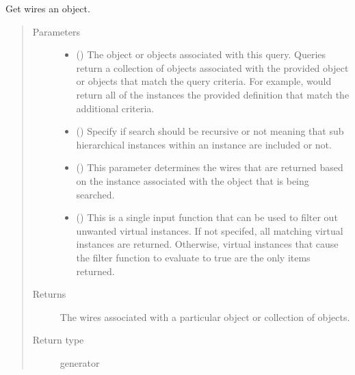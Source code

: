 \documentclass[letterpaper,10pt,english,openany,oneside]{sphinxmanual}
\begin{document}
\begin{fulllineitems}
\label{\detokenize{reference/classes/generated/spydrnet.get_wires:spydrnet.get_wires}}
Get wires  an object.
\begin{quote}\begin{description}
\item[{Parameters}] \leavevmode\begin{itemize}
\item {} 
 () \textendash{} The object or objects associated with this query. Queries return a collection of objects associated with the
provided object or objects that match the query criteria. For example,  would
return all of the instances  the provided definition that match the additional criteria.

\item {} 
 () \textendash{} Specify if search should be recursive or not meaning that sub hierarchical instances within an instance are
included or not.

\item {} 
 () \textendash{} This parameter determines the wires that are returned based on the instance associated with the object that is
being searched.

\item {} 
 () \textendash{} This is a single input function that can be used to filter out unwanted virtual instances. If not specifed, all
matching virtual instances are returned. Otherwise, virtual instances that cause the filter function to evaluate
to true are the only items returned.

\end{itemize}

\item[{Returns}] \leavevmode
{} \textendash{} The wires associated with a particular object or collection of objects.

\item[{Return type}] \leavevmode
generator

\end{description}\end{quote}

\end{fulllineitems}
\end{document}
